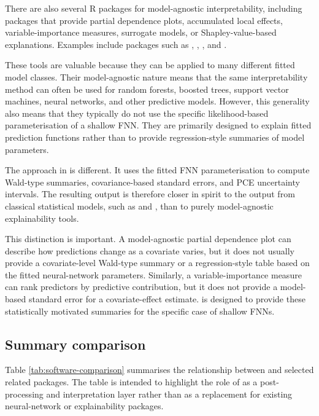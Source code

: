 There are also several R packages for model-agnostic interpretability, including packages that provide partial dependence plots, accumulated local effects, variable-importance measures, surrogate models, or Shapley-value-based explanations.
Examples include packages such as  \citep{pdp},  \citep{iml},  \citep{DALEX}, and  \citep{vip}.

These tools are valuable because they can be applied to many different fitted model classes.
Their model-agnostic nature means that the same interpretability method can often be used for random forests, boosted trees, support vector machines, neural networks, and other predictive models.
However, this generality also means that they typically do not use the specific likelihood-based parameterisation of a shallow FNN.
They are primarily designed to explain fitted prediction functions rather than to provide regression-style summaries of model parameters.

The approach in  is different.
It uses the fitted FNN parameterisation to compute Wald-type summaries, covariance-based standard errors, and PCE uncertainty intervals.
The resulting output is therefore closer in spirit to the output from classical statistical models, such as  and , than to purely model-agnostic explainability tools.

This distinction is important.
A model-agnostic partial dependence plot can describe how predictions change as a covariate varies, but it does not usually provide a covariate-level Wald-type summary or a regression-style table based on the fitted neural-network parameters.
Similarly, a variable-importance measure can rank predictors by predictive contribution, but it does not provide a model-based standard error for a covariate-effect estimate.
 is designed to provide these statistically motivated summaries for the specific case of shallow FNNs.

\subsection{Summary comparison}\label{summary-comparison}

Table \ref{tab:software-comparison} summarises the relationship between  and selected related packages.
The table is intended to highlight the role of  as a post-processing and interpretation layer rather than as a replacement for existing neural-network or explainability packages.


